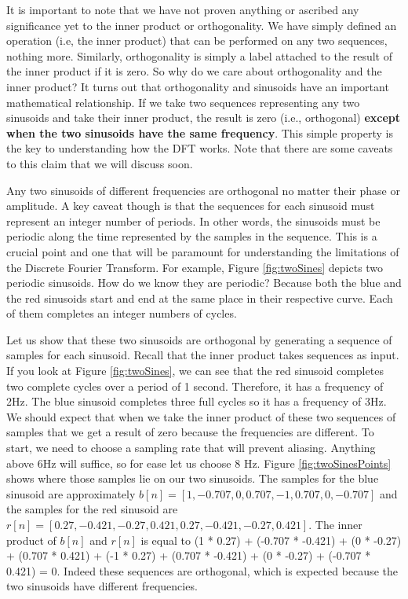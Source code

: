 It is important to note that we have not proven anything or ascribed any significance yet to the inner product
or orthogonality.  We have simply defined an operation (i.e, the inner product) that can be performed on any two sequences,
nothing more.  Similarly, orthogonality is simply a label attached to the result of the inner product if it is zero.  
So why do we care about orthogonality and the inner product?  It turns out that orthogonality and 
sinusoids have an important 
mathematical relationship.  If we take two sequences representing any two sinusoids and take their inner product, 
the result is zero
(i.e., orthogonal) 
\textbf{except when the two sinusoids have the same frequency}.  This simple property is the key to 
understanding how the DFT works.  Note that there are some caveats to this claim that we will discuss soon.

Any two sinusoids of different frequencies are orthogonal no matter their phase or amplitude.  A key caveat though
is that the sequences for each sinusoid must represent an integer number of periods.  
In other words, the sinusoids must be periodic along the time represented by the samples in the sequence.  
This is a crucial point and one that 
will be paramount for 
understanding the limitations of the Discrete Fourier Transform.  For example, Figure \ref{fig:twoSines} depicts two periodic sinusoids.
How do we know they are periodic?  Because both the blue and the red sinusoids start and end at the same place in their respective curve.  Each of them completes an integer numbers of cycles.  

Let us show that these two sinusoids are orthogonal by generating a sequence of samples for each sinusoid. Recall 
that the inner product takes sequences as input.  If you look at Figure \ref{fig:twoSines}, we can see that the red sinusoid
completes two complete cycles over a period of 1 second.  Therefore, it has a frequency of 2Hz.  The blue sinusoid
completes three full cycles so it has a frequency of 3Hz.  We should expect that when we take the inner product
of these two sequences of samples that we get a result of zero because the frequencies are different.  
To start, we need to choose a sampling rate that will prevent aliasing.  Anything above 6Hz will suffice, so for ease let us
 choose 8 Hz.  Figure \ref{fig:twoSinesPoints} shows 
where those samples lie on our two sinusoids.  The samples for the blue sinusoid are approximately $b[n] = [1, -0.707, 0, 0.707, -1, 0.707, 0, -0.707]$ and the samples for the red
sinusoid are $r[n] = [0.27, -0.421, -0.27, 0.421, 0.27, -0.421, -0.27, 0.421]$.  The inner
product of $b[n]$ and $r[n]$ is equal to (1 * 0.27) + (-0.707 * -0.421) + (0 * -0.27) + 
(0.707 * 0.421) + (-1 * 0.27) + (0.707 * -0.421) + (0 * -0.27) + (-0.707 * 0.421) = 0.  Indeed these sequences are orthogonal, which is expected because the two sinusoids have different frequencies.

